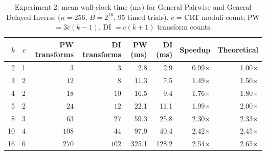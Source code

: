 \begin{table}[H]
\centering
\small
\begin{tabular}{r r r r r r r r}
\hline
$k$ & $c$ & PW transforms & DI transforms & PW (ms) & DI (ms) & Speedup & Theoretical \\
\hline
2 & 1 & $3$ & $3$ & 2.8 & 2.9 & 0.99$\times$ & 1.00$\times$ \\
3 & 2 & $12$ & $8$ & 11.3 & 7.5 & 1.49$\times$ & 1.50$\times$ \\
4 & 2 & $18$ & $10$ & 16.5 & 9.4 & 1.76$\times$ & 1.80$\times$ \\
5 & 2 & $24$ & $12$ & 22.1 & 11.1 & 1.99$\times$ & 2.00$\times$ \\
8 & 3 & $63$ & $27$ & 59.3 & 25.8 & 2.30$\times$ & 2.33$\times$ \\
10 & 4 & $108$ & $44$ & 97.9 & 40.4 & 2.42$\times$ & 2.45$\times$ \\
16 & 6 & $270$ & $102$ & 325.1 & 128.2 & 2.54$\times$ & 2.65$\times$ \\
\hline
\end{tabular}
\caption{Experiment 2: mean wall-clock time (ms) for General Pairwise and General Delayed Inverse ($n=256$, $B=2^{16}$, 95 timed trials). $c$ = CRT moduli count; PW $=3c(k-1)$, DI $=c(k+1)$ transform counts.}
\label{tab:exp2_times}
\end{table}
